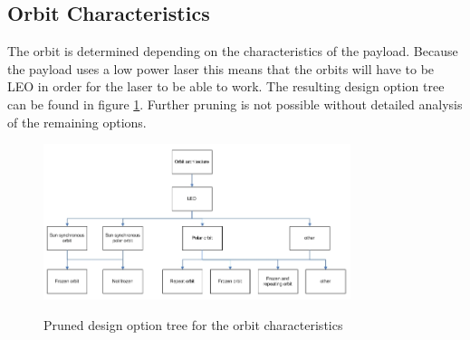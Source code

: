 \subsection{Orbit Characteristics}
\label{mtrTOprunedOrbit}
The orbit is determined depending on the characteristics of the payload. Because the payload uses a low power laser this means that the orbits will have to be \ac{LEO} in order for the laser to be able to work. The resulting design option tree can be found in figure \ref{fig:mtrTOPrunedOrbit}. Further pruning is not possible without detailed analysis of the remaining options.

\begin{figure}
\includegraphics[width=0.8\textwidth, angle=0]{chapters/MTR/img/PrunedOrbit.jpg}
\label{fig:mtrTOPrunedOrbit}
\caption{Pruned design option tree for the orbit characteristics}
\end{figure}